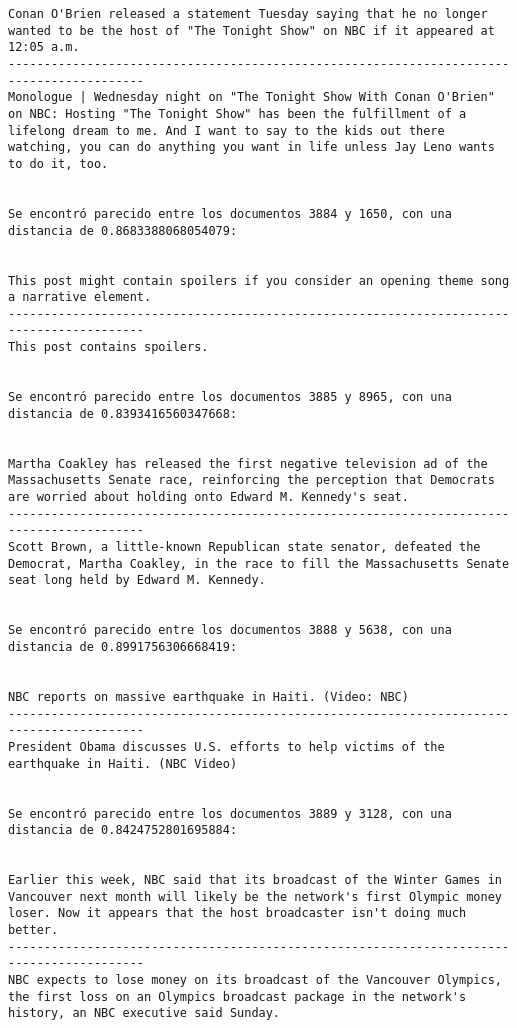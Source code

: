 \documentclass[11pt]{article}
\begin{document}
\begin{Verbatim}[commandchars=\\\{\}]
Conan O'Brien released a statement Tuesday saying that he no longer wanted to be the host of "The Tonight Show" on NBC if it appeared at 12:05 a.m.
-----------------------------------------------------------------------------------------
Monologue | Wednesday night on "The Tonight Show With Conan O'Brien" on NBC: Hosting "The Tonight Show" has been the fulfillment of a lifelong dream to me. And I want to say to the kids out there watching, you can do anything you want in life unless Jay Leno wants to do it, too.


Se encontró parecido entre los documentos 3884 y 1650, con una distancia de 0.8683388068054079:


This post might contain spoilers if you consider an opening theme song a narrative element.
-----------------------------------------------------------------------------------------
This post contains spoilers.


Se encontró parecido entre los documentos 3885 y 8965, con una distancia de 0.8393416560347668:


Martha Coakley has released the first negative television ad of the Massachusetts Senate race, reinforcing the perception that Democrats are worried about holding onto Edward M. Kennedy's seat.
-----------------------------------------------------------------------------------------
Scott Brown, a little-known Republican state senator, defeated the Democrat, Martha Coakley, in the race to fill the Massachusetts Senate seat long held by Edward M. Kennedy.


Se encontró parecido entre los documentos 3888 y 5638, con una distancia de 0.8991756306668419:


NBC reports on massive earthquake in Haiti. (Video: NBC)
-----------------------------------------------------------------------------------------
President Obama discusses U.S. efforts to help victims of the earthquake in Haiti. (NBC Video)


Se encontró parecido entre los documentos 3889 y 3128, con una distancia de 0.8424752801695884:


Earlier this week, NBC said that its broadcast of the Winter Games in Vancouver next month will likely be the network's first Olympic money loser. Now it appears that the host broadcaster isn't doing much better.
-----------------------------------------------------------------------------------------
NBC expects to lose money on its broadcast of the Vancouver Olympics, the first loss on an Olympics broadcast package in the network's history, an NBC executive said Sunday.



\end{Verbatim}
\end{document}

